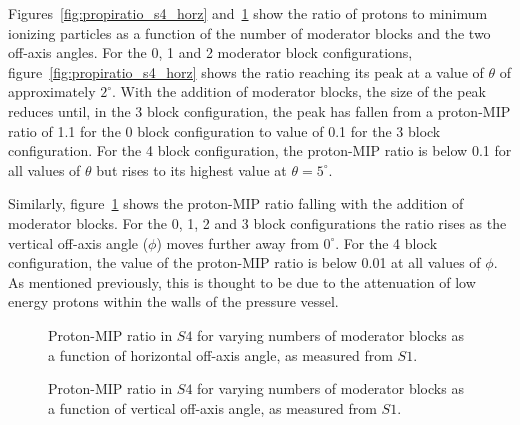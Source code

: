Figures~\ref{fig:propiratio_s4_horz} and~\ref{fig:propiratio_s4_vert} show the ratio of protons to minimum ionizing particles as a function of the number of moderator blocks and the two off-axis angles.
For the 0, 1 and 2 moderator block configurations, figure~\ref{fig:propiratio_s4_horz} shows the ratio reaching its peak at a value of $\theta$ of approximately $2^{\circ}$.
With the addition of moderator blocks, the size of the peak reduces until, in the 3 block configuration, the peak has fallen from a proton-MIP ratio of 1.1 for the 0 block configuration to value of 0.1 for the 3 block configuration. 
For the 4 block configuration, the proton-MIP ratio is below 0.1 for all values of $\theta$ but rises to its highest value at $\theta = 5^{\circ}$.

Similarly, figure~\ref{fig:propiratio_s4_vert} shows the proton-MIP ratio falling with the addition of moderator blocks.
For the 0, 1, 2 and 3 block configurations the ratio rises as the vertical off-axis angle ($\phi$) moves further away from $0^{\circ}$. 
For the 4 block configuration, the value of the proton-MIP ratio is below 0.01 at all values of $\phi$.
As mentioned previously, this is thought to be due to the attenuation of low energy protons within the walls of the pressure vessel.

\begin{figure}[!ht]
  \begin{minipage}[t]{0.48\textwidth}
    \begin{adjustbox}{max totalsize={\textwidth}{.35\textheight}, center}
      
    \end{adjustbox}
    \caption{Proton-MIP ratio in $\mathit{S4}$ for varying numbers of moderator blocks as a function of horizontal off-axis angle, as measured from $\mathit{S1}$.}
    \label{fig:propiratio_s4_horz}
  \end{minipage}
  \hspace{0.3cm}
  \begin{minipage}[t]{0.48\textwidth}
    \begin{adjustbox}{max totalsize={\textwidth}{.35\textheight}, center}
      
    \end{adjustbox}
    \caption{Proton-MIP ratio in $\mathit{S4}$ for varying numbers of moderator blocks as a function of vertical off-axis angle, as measured from $\mathit{S1}$.}
    \label{fig:propiratio_s4_vert}
  \end{minipage}	
\end{figure}

